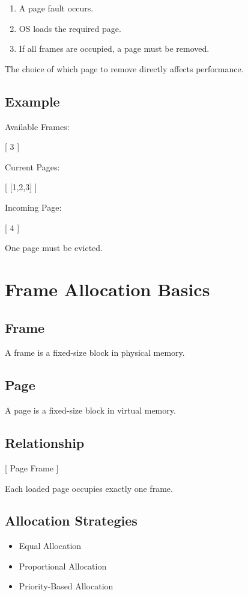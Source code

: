 \begin{enumerate}
\item A page fault occurs.
\item OS loads the required page.
\item If all frames are occupied, a page must be removed.
\end{enumerate}

The choice of which page to remove directly affects performance.

\subsection{Example}

Available Frames:

[
3
]

Current Pages:

[
[1,2,3]
]

Incoming Page:

[
4
]

One page must be evicted.

\section{Frame Allocation Basics}

\subsection{Frame}

A frame is a fixed-size block in physical memory.

\subsection{Page}

A page is a fixed-size block in virtual memory.

\subsection{Relationship}

[
Page \rightarrow Frame
]

Each loaded page occupies exactly one frame.

\subsection{Allocation Strategies}

\begin{itemize}
\item Equal Allocation
\item Proportional Allocation
\item Priority-Based Allocation
\end{itemize}

